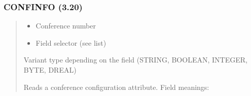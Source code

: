 \documentclass[letterpaper,10pt,english]{sphinxmanual}
\begin{document}
\subsubsection{CONFINFO (3.20)}
\label{\detokenize{ppl:id3}}\begin{quote}

\sphinxAtStartPar
{}
\begin{description}
\begin{itemize}
\item {} 
\sphinxAtStartPar
{} \textendash{} Conference number

\item {} 
\sphinxAtStartPar
{}   \textendash{} Field selector (see list)

\end{itemize}

\sphinxAtStartPar
Variant type depending on the field (STRING, BOOLEAN, INTEGER, BYTE, DREAL)

\sphinxAtStartPar
Reads a conference configuration attribute. Field meanings:

\end{description}

\sphinxAtStartPar
{}
\end{quote}
\end{document}
